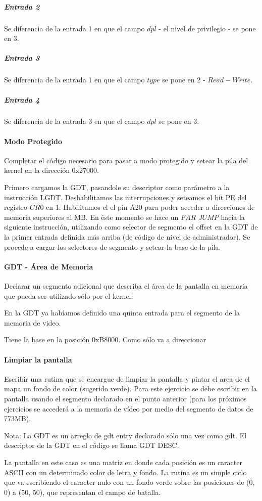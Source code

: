 \subparagraph*{Entrada 2}

Se diferencia de la entrada 1 en que el campo $dpl$ - el nivel de privilegio - se pone en 3.

\subparagraph*{Entrada 3}

Se diferencia de la entrada 1 en que el campo $type$ se pone en 2 - $Read-Write$.

\subparagraph*{Entrada 4}

Se diferencia de la entrada 3 en que el campo $dpl$ se pone en 3.




\paragraph{Modo Protegido}\label{subsubsec:ej1-b}
Completar el código necesario para pasar a modo protegido y setear la pila del
kernel en la dirección 0x27000.
\hruler

Primero cargamos la GDT, pasandole su descriptor como parámetro a la instrucción LGDT. Deshabilitamos las interrupciones y seteamos el bit PE del
registro $CR0$ en 1. 
Habilitamos el el pin A20 para poder acceder a direcciones de memoria superiores al MB.
En éste momento se hace un $FAR$ $JUMP$ hacia la siguiente instrucción, utilizando como selector de segmento el offset en la GDT de la primer 
entrada definida más arriba (de código de nivel de administrador).
Se procede a cargar los selectores de segmento y setear la base de la pila.

\paragraph{GDT - Área de Memoria}\label{subsubsec:ej1-c}
Declarar un segmento adicional que describa el área de la pantalla en memoria
que pueda ser utilizado sólo por el kernel.
\hruler

En la GDT ya habíamos definido una quinta entrada para el segmento de la memoria de video.

Tiene la base en la posición 0xB8000. Como sólo va a direccionar \fixme{}

\paragraph{Limpiar la pantalla}\label{subsubsec:ej1-d}
Escribir una rutina que se encargue de limpiar la pantalla y pintar el area de
el mapa un fondo de color (sugerido verde). Para este ejercicio se debe escribir
en la pantalla usando el segmento declarado en el punto anterior (para los
próximos ejercicios se accederá a la memoria de vídeo por medio del segmento de
datos de 773MB).

Nota: La GDT es un arreglo de gdt entry declarado sólo una vez como gdt. El
descriptor de la GDT en el código se llama GDT DESC.

\hruler
La pantalla en este caso es una matriz en donde cada posición es un caracter ASCII con un determinado color de letra y fondo. La rutina es un
simple ciclo que va escribiendo el caracter nulo con un fondo verde sobre las posiciones de (0, 0) a (50, 50), que representan el campo de
batalla.
